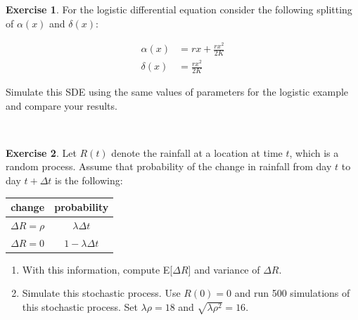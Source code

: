 \documentclass[
]{book}
\theoremstyle{definition}
\theoremstyle{definition}
\theoremstyle{definition}
\newtheorem{exercise}{Exercise}[chapter]
\theoremstyle{remark}
\begin{document}
\begin{exercise}
\protect\hypertarget{exr:unnamed-chunk-352}{}{\label{exr:unnamed-chunk-352} }For the logistic differential equation consider the following splitting of \(\alpha(x)\) and \(\delta(x)\):

\begin{align*}
\alpha(x) &= rx + \frac{rx^{2}}{2K} \\
\delta(x) &=  \frac{rx^{2}}{2K}
\end{align*}

Simulate this SDE using the same values of parameters for the logistic example and compare your results.
\end{exercise}

~

\begin{exercise}
\protect\hypertarget{exr:unnamed-chunk-353}{}{\label{exr:unnamed-chunk-353} }Let \(R(t)\) denote the rainfall at a location at time \(t\), which is a random process. Assume that probability of the change in rainfall from day \(t\) to day \(t+\Delta t\) is the following:

\begin{tabular}
{ c c}
change & probability \\ \hline \hline
$\Delta R = \rho$ & $\lambda \Delta t$ \\
$\Delta R = 0$ & $1- \lambda \Delta t$ \\ \hline
\end {tabular}

\begin{enumerate}[label=\alph*.]
\item With this information, compute E[$\Delta R$] and variance of $\Delta R$.
\item Simulate this stochastic process.  Use $R(0)=0$ and run 500 simulations of this stochastic process.  Set $\lambda \rho = 18$ and $\sqrt{ \lambda \rho^{2}}=16$.
\end{enumerate}
\end{exercise}

~
\end{document}
